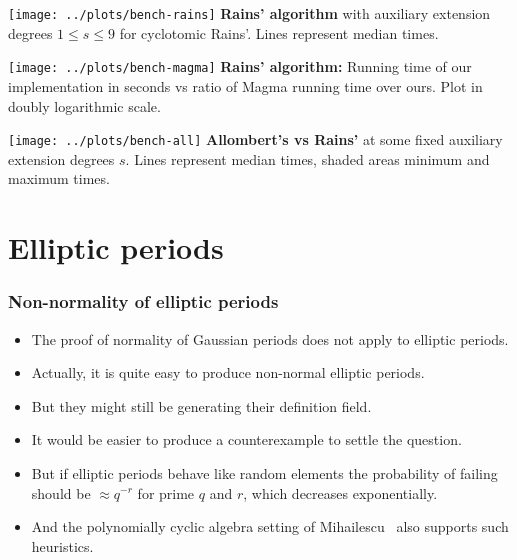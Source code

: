 \documentclass[francais]{beamer}
\begin{document}
\begin{frame}
    \centering
    \texttt{[image: ../plots/bench-rains]}
      \flushleft
      \textbf{Rains' algorithm} with auxiliary extension degrees $1 \leq s \leq 9$ for cyclotomic Rains'.
      Lines represent median times.
\end{frame}

\begin{frame}
    \centering
    \texttt{[image: ../plots/bench-magma]}
      \flushleft
      \textbf{Rains' algorithm:}
      Running time of our implementation in seconds vs ratio of
      Magma running time over ours. Plot in doubly logarithmic scale.
\end{frame}

\begin{frame}
    \centering
    \texttt{[image: ../plots/bench-all]}
    \flushleft
      \textbf{Allombert's vs Rains'} at some fixed auxiliary extension
      degrees $s$. Lines represent median times, shaded areas minimum
      and maximum times.
\end{frame}

\section{Elliptic periods}

\begin{frame}\frametitle{Non-normality of elliptic periods}
  \begin{itemize}
  \item The proof of normality of Gaussian periods does not apply to elliptic periods.
  \item Actually, it is quite easy to produce non-normal elliptic periods.
  \item But they might still be generating their definition field.
  \end{itemize}
  \bigskip
  \begin{itemize}
  \item It would be easier to produce a counterexample to settle the question.
  \item But if elliptic periods behave like random elements the probability of failing should be $\approx q^{-r}$ for prime $q$ and $r$, which decreases exponentially.
  \item And the polynomially cyclic algebra setting of Mihailescu~\cite{Mihailescu2010825} also supports such heuristics.
  \end{itemize}
\end{frame}
\end{document}
